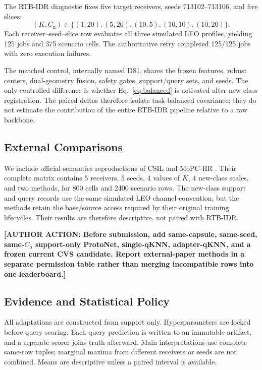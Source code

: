 \documentclass[journal]{IEEEtran}
\newcommand{\stagehead}{RTB-IDR}
\newcommand{\authoraction}[1]{\par\noindent\textbf{[AUTHOR ACTION: #1]}\par}
\begin{document}
The \stagehead{} diagnostic fixes five target receivers, seeds 713102--713106, and five slices:
\[
(K,C_{\mathrm{n}})\in
\{(1,20),(5,20),(10,5),(10,10),(10,20)\}.
\]
Each receiver--seed--slice row evaluates all three simulated LEO profiles, yielding 125 jobs and 375 scenario cells. The authoritative retry completed 125/125 jobs with zero execution failures.

The matched control, internally named D81, shares the frozen features, robust centers, dual-geometry fusion, safety gates, support/query sets, and seeds. The only controlled difference is whether Eq.~\eqref{eq:balanced} is activated after new-class registration. The paired deltas therefore isolate task-balanced covariance; they do not estimate the contribution of the entire \stagehead{} pipeline relative to a raw backbone.

\subsection{External Comparisons}

We include official-semantics reproductions of CSIL \cite{liu2021csil} and MoPC-HR \cite{li2025mopchr}. Their complete matrix contains \(5\) receivers, \(5\) seeds, \(4\) values of \(K\), \(4\) new-class scales, and two methods, for 800 cells and 2400 scenario rows. The new-class support and query records use the same simulated LEO channel convention, but the methods retain the base/source access required by their original training lifecycles. Their results are therefore descriptive, not paired with \stagehead{}.

\authoraction{Before submission, add same-capsule, same-seed, same-\(C_{\mathrm{n}}\) support-only ProtoNet, single-qKNN, adapter-qKNN, and a frozen current CVS candidate. Report external-paper methods in a separate permission table rather than merging incompatible rows into one leaderboard.}

\subsection{Evidence and Statistical Policy}

All adaptations are constructed from support only. Hyperparameters are locked before query scoring. Each query prediction is written to an immutable artifact, and a separate scorer joins truth afterward. Main interpretations use complete same-row tuples; marginal maxima from different receivers or seeds are not combined. Means are descriptive unless a paired interval is available.
\end{document}
